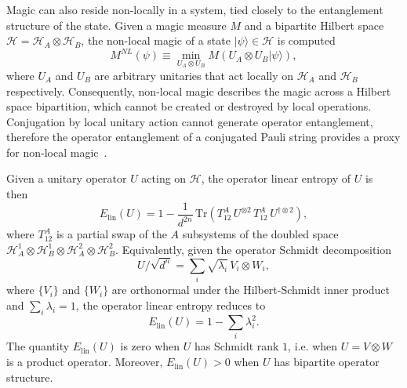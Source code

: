 \documentclass[12pt,a4paper]{article}
\def\ket#1{{|{#1}\rangle}}
\begin{document}
Magic can also reside non-locally in a system, tied closely to the entanglement structure of the state. Given a magic measure $M$ and a bipartite Hilbert space $\mathcal{H} = \mathcal{H}_A \otimes \mathcal{H}_B$, the non-local magic of a state $\ket{\psi} \in \mathcal{H}$ is computed
%
\begin{equation}\label{eq:NLMagic}
M^{NL}(\psi) \equiv \min_{U_A \otimes U_B} M\left(U_A \otimes U_B \ket{\psi}\right),
\end{equation}
%
where $U_A$ and $U_B$ are arbitrary unitaries that act locally on $\mathcal{H}_A$ and $\mathcal{H}_B$ respectively. Consequently, non-local magic describes the magic across a Hilbert space bipartition, which cannot be created or destroyed by local operations. Conjugation by local unitary action cannot generate operator entanglement, therefore the operator entanglement of a conjugated Pauli string provides a proxy for non-local magic~\cite{faidon:2026}.

Given a unitary operator $U$ acting on $\mathcal{H}$, the operator linear entropy of $U$ is then~\cite{faidon:2026}
%
\begin{equation}\label{ElinDef}
E_{\mathrm{lin}}(U) = 1-\frac{1}{d^{2n}}\,\mathrm{Tr}\left(T^A_{12}\,U^{\otimes 2}\,T^A_{12}\,U^{\dagger\otimes 2}\right),
\end{equation}
%
where $T^A_{12}$ is a partial swap of the $A$ subsystems of the doubled space $\mathcal{H}_A^1 \otimes \mathcal{H}_B^1 \otimes \mathcal{H}_A^2 \otimes \mathcal{H}_B^2$. Equivalently, given the operator Schmidt decomposition
%
\begin{equation}\label{OpSchmidtDecomp}
    U/\sqrt{d^n} = \sum_i \sqrt{\lambda_i}\, V_i \otimes W_i, 
\end{equation}
%
where $\{V_i\}$ and $\{W_i\}$ are orthonormal under the Hilbert-Schmidt inner product and $\sum_i \lambda_i = 1$, the operator linear entropy reduces to
%
\begin{equation}\label{ELimReduction}
    E_{\mathrm{lin}}(U) = 1 - \sum_i \lambda_i^2.  
\end{equation}
%
The quantity $E_{\mathrm{lin}}(U)$ is zero when $U$ has Schmidt rank $1$, i.e. when $U = V \otimes W$ is a product operator. Moreover, $E_{\mathrm{lin}}(U) > 0$ when $U$ has bipartite operator structure.
\end{document}
